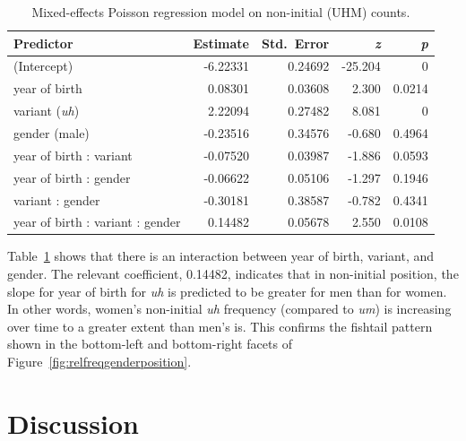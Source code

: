 \documentclass[11pt]{article}
\begin{document}
\begin{table}
    \centering
    \begin{tabular}{lrrrr}
        \toprule
        Predictor                        & Estimate & Std.~Error & \emph{z} & \emph{p} \\
        \midrule
        (Intercept)                      & -6.22331 & 0.24692    & -25.204  & 0      \\
        year of birth                    & 0.08301  & 0.03608    & 2.300    & 0.0214 \\
        variant (\emph{uh})              & 2.22094  & 0.27482    & 8.081    & 0      \\
        gender (male)                    & -0.23516 & 0.34576    & -0.680   & 0.4964 \\
        year of birth : variant          & -0.07520 & 0.03987    & -1.886   & 0.0593 \\
        year of birth : gender           & -0.06622 & 0.05106    & -1.297   & 0.1946 \\
        variant : gender                 & -0.30181 & 0.38587    & -0.782   & 0.4341 \\
        year of birth : variant : gender & 0.14482  & 0.05678    & 2.550    & 0.0108 \\
        \bottomrule
    \end{tabular}
    \caption{Mixed-effects Poisson regression model on non-initial (UHM) counts.}\label{tab:poisson}
\end{table}

Table~\ref{tab:poisson} shows that there is an interaction between year of birth,
variant, and gender.
The relevant coefficient, 0.14482, indicates that in non-initial position, the
slope for year of birth for \emph{uh} is predicted to be greater for men than
for women.
In other words, women's non-initial \emph{uh} frequency (compared to \emph{um})
is increasing over time to a greater extent than men's is.
This confirms the fishtail pattern shown in the bottom-left and bottom-right
facets of Figure~\ref{fig:relfreqgenderposition}.

\section{Discussion}
\end{document}
